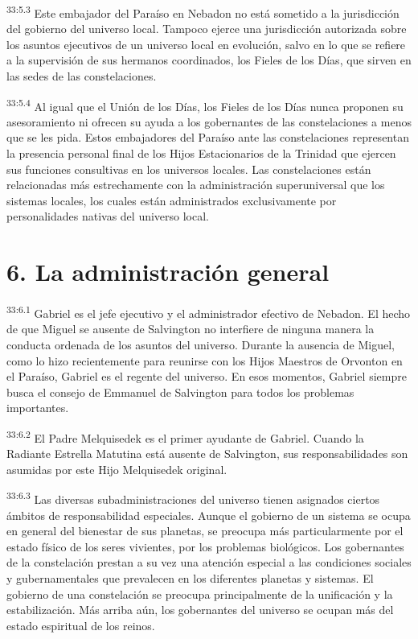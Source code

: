 \par
\textsuperscript{33:5.3} Este embajador del Paraíso en Nebadon no está sometido a la jurisdicción del gobierno del universo local. Tampoco ejerce una jurisdicción autorizada sobre los asuntos ejecutivos de un universo local en evolución, salvo en lo que se refiere a la supervisión de sus hermanos coordinados, los Fieles de los Días, que sirven en las sedes de las constelaciones.

\par
\textsuperscript{33:5.4} Al igual que el Unión de los Días, los Fieles de los Días nunca proponen su asesoramiento ni ofrecen su ayuda a los gobernantes de las constelaciones a menos que se les pida. Estos embajadores del Paraíso ante las constelaciones representan la presencia personal final de los Hijos Estacionarios de la Trinidad que ejercen sus funciones consultivas en los universos locales. Las constelaciones están relacionadas más estrechamente con la administración superuniversal que los sistemas locales, los cuales están administrados exclusivamente por personalidades nativas del universo local.

\section*{6. La administración general}
\par
\textsuperscript{33:6.1} Gabriel es el jefe ejecutivo y el administrador efectivo de Nebadon. El hecho de que Miguel se ausente de Salvington no interfiere de ninguna manera la conducta ordenada de los asuntos del universo. Durante la ausencia de Miguel, como lo hizo recientemente para reunirse con los Hijos Maestros de Orvonton en el Paraíso, Gabriel es el regente del universo. En esos momentos, Gabriel siempre busca el consejo de Emmanuel de Salvington para todos los problemas importantes.

\par
\textsuperscript{33:6.2} El Padre Melquisedek es el primer ayudante de Gabriel. Cuando la Radiante Estrella Matutina está ausente de Salvington, sus responsabilidades son asumidas por este Hijo Melquisedek original.

\par
\textsuperscript{33:6.3} Las diversas subadministraciones del universo tienen asignados ciertos ámbitos de responsabilidad especiales. Aunque el gobierno de un sistema se ocupa en general del bienestar de sus planetas, se preocupa más particularmente por el estado físico de los seres vivientes, por los problemas biológicos. Los gobernantes de la constelación prestan a su vez una atención especial a las condiciones sociales y gubernamentales que prevalecen en los diferentes planetas y sistemas. El gobierno de una constelación se preocupa principalmente de la unificación y la estabilización. Más arriba aún, los gobernantes del universo se ocupan más del estado espiritual de los reinos.

